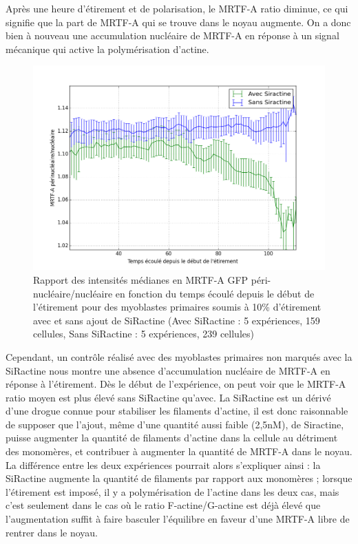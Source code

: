 Après une heure d'étirement et de polarisation, le MRTF-A ratio diminue, ce qui signifie que la part de MRTF-A qui se trouve dans le noyau augmente. 
On a donc bien à nouveau une accumulation nucléaire de MRTF-A en réponse à un signal mécanique qui active la polymérisation d'actine. 

\begin{figure}
\includegraphics[scale=0.4]{Figures/Avec_Sans_Siractine.png} 
\caption{Rapport des intensités médianes en MRTF-A GFP  péri-nucléaire/nucléaire en fonction du temps écoulé depuis le début de l'étirement pour des myoblastes primaires soumis à 10\% d'étirement avec et sans ajout de SiRactine (Avec SiRactine : 5 expériences, 159 cellules, Sans SiRactine : 5 expériences, 239 cellules)}
\end{figure}

Cependant, un contrôle réalisé avec des myoblastes primaires non marqués avec la SiRactine nous montre une absence d'accumulation nucléaire de MRTF-A en réponse à l'étirement. 
Dès le début de l'expérience, on peut voir que le MRTF-A ratio moyen est plus élevé sans SiRactine qu'avec. 
La SiRactine est un dérivé d'une drogue connue pour stabiliser les filaments d'actine, il est donc raisonnable de supposer que l'ajout, même d'une quantité aussi faible (2,5nM), de Siractine, puisse augmenter la quantité de filaments d'actine dans la cellule au détriment des monomères, et contribuer à augmenter la quantité de MRTF-A dans le noyau. 
La différence entre les deux expériences pourrait alors s'expliquer ainsi : la SiRactine augmente la quantité de filaments par rapport aux monomères ; lorsque l'étirement est imposé, il y a polymérisation de l'actine dans les deux cas, mais c'est seulement dans le cas où le ratio F-actine/G-actine est déjà élevé que l'augmentation suffit à faire basculer l'équilibre en faveur d'une MRTF-A libre de rentrer dans le noyau. 

